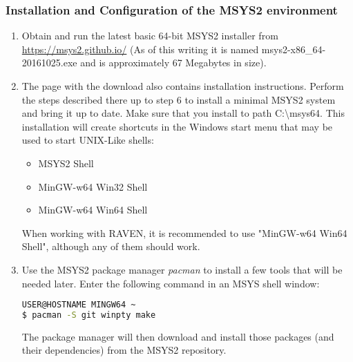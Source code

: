 \subsubsection{Installation and Configuration of the MSYS2 environment}
\begin{enumerate}
    \item Obtain and run the latest basic 64-bit MSYS2 installer from \url{ https://msys2.github.io/} (As of this writing it is named
	msys2-x86\_64-20161025.exe and is approximately 67 Megabytes in size).
    \item The page with the download also contains installation instructions. Perform the steps described there up to
	step 6 to install a minimal MSYS2 system and bring it up to date. Make sure that you install to path 
        C:\textbackslash{}msys64.  This installation will create shortcuts in the Windows start menu that may be used 
        to start UNIX-Like shells:
		\begin{itemize}
	    		\item MSYS2 Shell
	    		\item MinGW-w64 Win32 Shell
	    		\item MinGW-w64 Win64 Shell
		\end{itemize}
        When working with RAVEN, it is recommended to use "MinGW-w64 Win64 Shell", although any of them should work.
    \item Use the MSYS2 package manager {\it pacman} to install a few tools that will be needed later.  Enter the following command in an MSYS shell window:

\begin{lstlisting}[language=bash]
USER@HOSTNAME MINGW64 ~
$ pacman -S git winpty make
\end{lstlisting}
	The package manager will then download and install those packages (and their dependencies) from the MSYS2 
	repository.
\end{enumerate}

